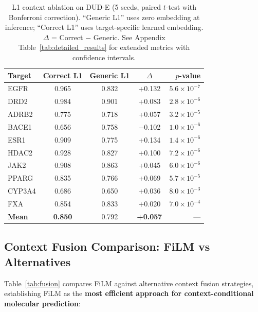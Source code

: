 \documentclass{article}
\begin{document}
\begin{table}[t]
\vspace{-2mm}
\caption{L1 context ablation on DUD-E (5 seeds, paired $t$-test with Bonferroni correction). ``Generic L1'' uses zero embedding at inference; ``Correct L1'' uses target-specific learned embedding. $\Delta$ = Correct $-$ Generic. See Appendix Table~\ref{tab:detailed_results} for extended metrics with confidence intervals.}
\label{tab:l1_ablation}
\centering
\small
\begin{tabular*}{\textwidth}{@{\extracolsep{\fill}}lcccr@{}}
\toprule
Target & Correct L1 & Generic L1 & $\Delta$ & $p$-value \\
\midrule
EGFR & 0.965 & 0.832 & +0.132 & $5.6 \times 10^{-7}$ \\
DRD2 & 0.984 & 0.901 & +0.083 & $2.8 \times 10^{-6}$ \\
ADRB2 & 0.775 & 0.718 & +0.057 & $3.2 \times 10^{-5}$ \\
BACE1 & 0.656 & 0.758 & $-$0.102 & $1.0 \times 10^{-6}$ \\
ESR1 & 0.909 & 0.775 & +0.134 & $1.4 \times 10^{-6}$ \\
HDAC2 & 0.928 & 0.827 & +0.100 & $7.2 \times 10^{-6}$ \\
JAK2 & 0.908 & 0.863 & +0.045 & $6.0 \times 10^{-6}$ \\
PPARG & 0.835 & 0.766 & +0.069 & $5.7 \times 10^{-5}$ \\
CYP3A4 & 0.686 & 0.650 & +0.036 & $8.0 \times 10^{-3}$ \\
FXA & 0.854 & 0.833 & +0.020 & $7.0 \times 10^{-4}$ \\
\midrule
\textbf{Mean} & \textbf{0.850} & 0.792 & \textbf{+0.057} & --- \\
\bottomrule
\end{tabular*}
\vspace{-2mm}
\end{table}

\subsection{Context Fusion Comparison: FiLM vs Alternatives}

Table~\ref{tab:fusion} compares FiLM against alternative context fusion strategies, establishing FiLM as the \textbf{most efficient approach for context-conditional molecular prediction}:
\end{document}
